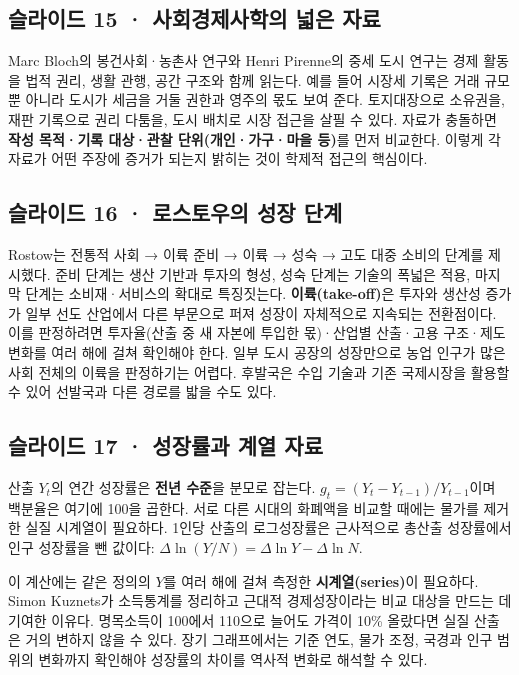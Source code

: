 \documentclass[10pt,a4paper]{article}
\begin{document}
\subsection{슬라이드 15 · 사회경제사학의 넓은 자료}
Marc Bloch의 봉건사회·농촌사 연구와 Henri Pirenne의 중세 도시 연구는 경제 활동을 법적 권리, 생활 관행, 공간 구조와 함께 읽는다. 예를 들어 시장세 기록은 거래 규모뿐 아니라 도시가 세금을 거둘 권한과 영주의 몫도 보여 준다. 토지대장으로 소유권을, 재판 기록으로 권리 다툼을, 도시 배치로 시장 접근을 살필 수 있다. 자료가 충돌하면 \textbf{작성 목적·기록 대상·관찰 단위(개인·가구·마을 등)}를 먼저 비교한다. 이렇게 각 자료가 어떤 주장에 증거가 되는지 밝히는 것이 학제적 접근의 핵심이다.\par

\subsection{슬라이드 16 · 로스토우의 성장 단계}
Rostow는 전통적 사회 → 이륙 준비 → 이륙 → 성숙 → 고도 대중 소비의 단계를 제시했다. 준비 단계는 생산 기반과 투자의 형성, 성숙 단계는 기술의 폭넓은 적용, 마지막 단계는 소비재·서비스의 확대로 특징짓는다. \textbf{이륙(take-off)}은 투자와 생산성 증가가 일부 선도 산업에서 다른 부문으로 퍼져 성장이 자체적으로 지속되는 전환점이다. 이를 판정하려면 투자율(산출 중 새 자본에 투입한 몫)·산업별 산출·고용 구조·제도 변화를 여러 해에 걸쳐 확인해야 한다. 일부 도시 공장의 성장만으로 농업 인구가 많은 사회 전체의 이륙을 판정하기는 어렵다. 후발국은 수입 기술과 기존 국제시장을 활용할 수 있어 선발국과 다른 경로를 밟을 수도 있다.\par

\subsection{슬라이드 17 · 성장률과 계열 자료}
산출 $Y_t$의 연간 성장률은 \textbf{전년 수준}을 분모로 잡는다. $g_t=(Y_t-Y_{t-1})/Y_{t-1}$이며 백분율은 여기에 100을 곱한다. 서로 다른 시대의 화폐액을 비교할 때에는 물가를 제거한 실질 시계열이 필요하다. 1인당 산출의 로그성장률은 근사적으로 총산출 성장률에서 인구 성장률을 뺀 값이다: $\Delta\ln(Y/N)=\Delta\ln Y-\Delta\ln N$.\par

이 계산에는 같은 정의의 $Y$를 여러 해에 걸쳐 측정한 \textbf{시계열(series)}이 필요하다. Simon Kuznets가 소득통계를 정리하고 근대적 경제성장이라는 비교 대상을 만드는 데 기여한 이유다. 명목소득이 100에서 110으로 늘어도 가격이 10\% 올랐다면 실질 산출은 거의 변하지 않을 수 있다. 장기 그래프에서는 기준 연도, 물가 조정, 국경과 인구 범위의 변화까지 확인해야 성장률의 차이를 역사적 변화로 해석할 수 있다.\par
\end{document}
